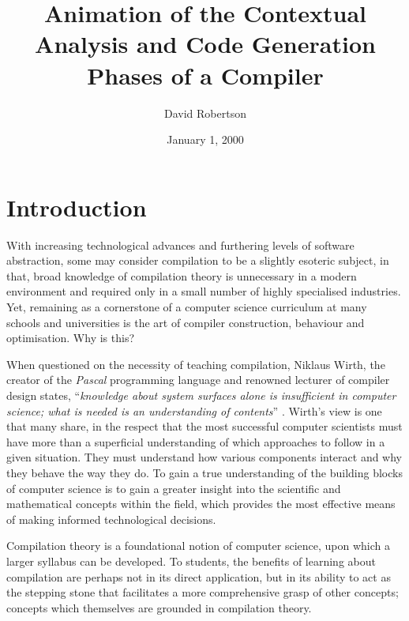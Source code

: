 \documentclass{l4proj}
\begin{document}
\title{Animation of the Contextual Analysis and Code Generation Phases of a Compiler}
\author{David Robertson}
\date{January 1, 2000}
\maketitle

\begin{abstract}

\end{abstract}

\educationalconsent
%
%
\tableofcontents

\chapter{Introduction}
With increasing technological advances and furthering levels of software abstraction, some may consider compilation to be a slightly esoteric subject, in that, broad knowledge of compilation theory is unnecessary in a modern environment and required only in a small number of highly specialised industries. Yet, remaining as a cornerstone of a computer science curriculum at many schools and universities is the art of compiler construction, behaviour and optimisation. Why is this?

When questioned on the necessity of teaching compilation, Niklaus Wirth, the creator of the \textit{Pascal} programming language and renowned lecturer of compiler design states, ``\textit{knowledge about system surfaces alone is insufficient in computer science; what is needed is an understanding of contents}'' \cite{WirthTheory}. Wirth's view is one that many share, in the respect that the most successful computer scientists must have more than a superficial understanding of which approaches to follow in a given situation. They must understand how various components interact and why they behave the way they do. To gain a true understanding of the building blocks of computer science is to gain a greater insight into the scientific and mathematical concepts within the field, which provides the most effective means of making informed technological decisions. 

Compilation theory is a foundational notion of computer science, upon which a larger syllabus can be developed. To students, the benefits of learning about compilation are perhaps not in its direct application, but in its ability to act as the stepping stone that facilitates a more comprehensive grasp of other concepts; concepts which themselves are grounded in compilation theory.  
\end{document}
